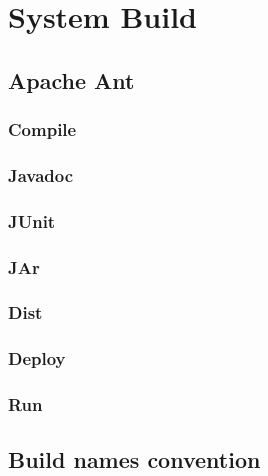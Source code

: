 \documentclass{report}
\begin{document}
\chapter{System Build}
\section{Apache Ant}
\subsection{Compile}
\subsection{Javadoc}
\subsection{JUnit}
\subsection{JAr}
\subsection{Dist}
\subsection{Deploy}
\subsection{Run}
\section{Build names convention}
\end{document}
